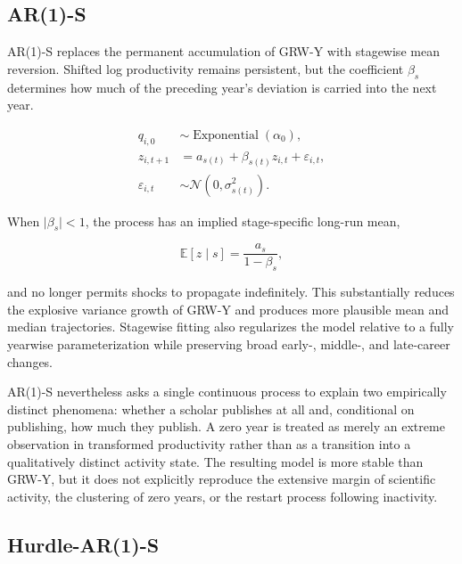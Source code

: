 \documentclass[twocolumn, letterpaper]{article}
\begin{document}
\subsection{AR(1)-S}
\label{supp:ar1_s}

AR(1)-S replaces the permanent accumulation of GRW-Y with stagewise mean reversion. Shifted log productivity remains persistent, but the coefficient \(\beta_s\) determines how much of the preceding year's deviation is carried into the next year.

\begin{equation}
    \begin{aligned}
    q_{i,0}
        &\sim \operatorname{Exponential}(\alpha_0), \\[4pt]
    z_{i,t+1}
        &=a_{s(t)}
        +\beta_{s(t)}z_{i,t}
        +\varepsilon_{i,t}, \\[4pt]
    \varepsilon_{i,t}
        &\sim
        \mathcal{N}
        \left(
            0,\sigma_{s(t)}^2
        \right).
    \end{aligned}
\label{eq:ar1_s}
\end{equation}

When \(\lvert\beta_s\rvert<1\), the process has an implied stage-specific long-run mean,

\[
    \mathbb{E}[z\mid s]
    =
    \frac{a_s}{1-\beta_s},
\]

and no longer permits shocks to propagate indefinitely. This substantially reduces the explosive variance growth of GRW-Y and produces more plausible mean and median trajectories. Stagewise fitting also regularizes the model relative to a fully yearwise parameterization while preserving broad early-, middle-, and late-career changes.

AR(1)-S nevertheless asks a single continuous process to explain two empirically distinct phenomena: whether a scholar publishes at all and, conditional on publishing, how much they publish. A zero year is treated as merely an extreme observation in transformed productivity rather than as a transition into a qualitatively distinct activity state. The resulting model is more stable than GRW-Y, but it does not explicitly reproduce the extensive margin of scientific activity, the clustering of zero years, or the restart process following inactivity.

\subsection{Hurdle-AR(1)-S}
\label{supp:hurdle_ar1_s}
\end{document}
